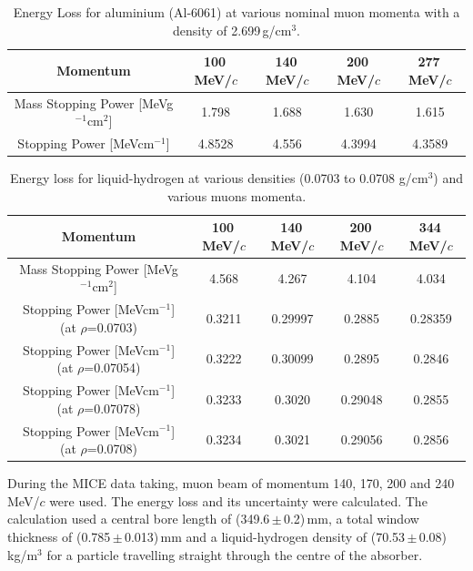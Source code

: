 \begin{table}[htb!]
  \caption{
    Energy Loss for aluminium (Al-6061) at various nominal muon momenta with a density of 2.699\,g/cm$^{3}$.
  }
  \label{tab:Aluminium}
  \begin{center}
    \begin{tabular}{c|c|c|c|c}
    
\textbf{Momentum} & \textbf{100\,MeV/$c$} & \textbf{140\,MeV/$c$} & \textbf{200\,MeV/$c$} & \textbf{277\,MeV/$c$}     \rule{0pt}{14pt} \\
\hline
{Mass Stopping Power [MeVg${}^{-1}$cm${}^{2}$] } & 1.798 & 1.688 & 1.630 & 1.615
\\
{Stopping Power [MeVcm${}^{-1}$] } & 4.8528 & 4.556 & 4.3994 & 4.3589
\\

    \end{tabular}
  \end{center}
\end{table} 

\begin{table}
  \caption{
    Energy loss for liquid-hydrogen at various densities (0.0703 to 0.0708 g/cm${}^{3}$) and various muons momenta.}
  \label{tab:Hydrogen}
  \begin{center}
    \begin{tabular}{c|c|c|c|c}
\textbf{Momentum} & \textbf{100\,MeV/$c$} & \textbf{140\,MeV/$c$} & \textbf{200\,MeV/$c$} & \textbf{344\,MeV/$c$}     \rule{0pt}{14pt} \\
\hline
{Mass Stopping Power [MeVg${}^{-1}$cm${}^{2}$] } & 4.568 & 4.267 & 4.104 & 4.034 \\
{Stopping Power [MeVcm${}^{-1}$] }(at $\rho$=0.0703)\textbf{} & 0.3211 & 0.29997 & 0.2885 & 0.28359\\
{Stopping Power [MeVcm${}^{-1}$] }(at $\rho$=0.07054)\textbf{} & 0.3222 & 0.30099 & 0.2895 & 0.2846 \\
{Stopping Power [MeVcm${}^{-1}$] }(at $\rho$=0.07078)\textbf{} & 0.3233 & 0.3020 & 0.29048 & 0.2855 \\
{Stopping Power [MeVcm${}^{-1}$] }(at $\rho$=0.0708)\textbf{} & 0.3234 & 0.3021 & 0.29056 & 0.2856 \\
    \end{tabular}
  \end{center}
\end{table} 


During the MICE data taking, muon beam of momentum 140, 170, 200 and 240\,MeV/$c$ were used. The energy loss and its uncertainty were calculated. The calculation used a central bore length of (349.6\,$\mathrm{\pm}$\,0.2)\,mm, a total window thickness of (0.785\,$\mathrm{\pm}$\,0.013)\,mm and a liquid-hydrogen density of (70.53\,$\mathrm{\pm}$\,0.08)\,kg/m$^{3}$ for a particle travelling straight through the centre of the absorber.

